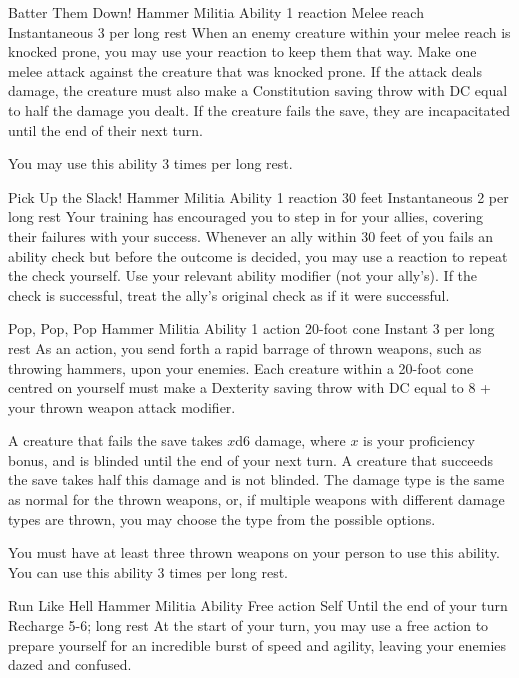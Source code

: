 \ability%
    {Batter Them Down!}
    {Hammer Militia Ability}
    {1 reaction}
    {Melee reach}
    {Instantaneous}
    {3 per long rest}
When an enemy creature within your melee reach is knocked prone,
you may use your reaction to keep them that way. 
Make one melee attack against the creature
that was knocked prone.
If the attack deals damage,
the creature must also make a Constitution saving throw
with DC equal to half the damage you dealt.
If the creature fails the save,
they are incapacitated until the end of their next turn.

You may use this ability 3 times per long rest.


\ability%
    {Pick Up the Slack!}
    {Hammer Militia Ability}
    {1 reaction}
    {30 feet}
    {Instantaneous}
    {2 per long rest}
Your training has encouraged you to step in for your allies,
covering their failures with your success.
Whenever an ally within 30 feet of you fails an ability check
but before the outcome is decided,
you may use a reaction to repeat the check yourself.
Use your relevant ability modifier (not your ally's).
If the check is successful,
treat the ally's original check as if it were successful.

\ability%
    {Pop, Pop, Pop}
    {Hammer Militia Ability}
    {1 action}
    {20-foot cone}
    {Instant}
    {3 per long rest}
As an action,
you send forth a rapid barrage of thrown weapons,
such as throwing hammers, upon your enemies.
Each creature within a 20-foot cone centred on yourself
must make a Dexterity saving throw with DC equal to
8 + your thrown weapon attack modifier.

A creature that fails the save takes $x$d6 damage,
where $x$ is your proficiency bonus,
and is blinded until the end of your next turn.
A creature that succeeds the save takes half this damage
and is not blinded.
The damage type is the same as normal for the thrown weapons,
or, if multiple weapons with different damage types are thrown,
you may choose the type from the possible options.

You must have at least three thrown weapons on your person
to use this ability.
You can use this ability 3 times per long rest.


\ability%
    {Run Like Hell}
    {Hammer Militia Ability}
    {Free action}
    {Self}
    {Until the end of your turn}
    {Recharge 5-6; long rest}
At the start of your turn,
you may use a free action to prepare yourself
for an incredible burst of speed and agility,
leaving your enemies dazed and confused.

